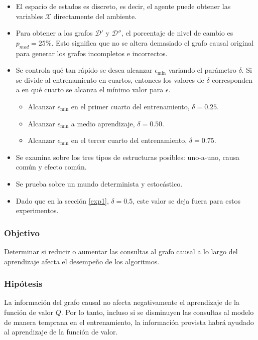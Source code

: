 \begin{itemize}
    \item El espacio de estados es discreto, es decir, el agente puede
    obtener las variables $\mathcal{X}$ directamente del ambiente.
    \item Para obtener a los
    grafos $\mathcal{D'}$ y $\mathcal{D''}$,
    el porcentaje de nivel de cambio  es $p_{mod} = 25 \%$. Esto significa que no se altera demasiado el grafo causal original para
    generar los grafos incompletos e incorrectos.
    \item Se controla qué tan rápido se desea alcanzar $\epsilon_{\min}$ variando el parámetro $\delta$. Si se divide al entrenamiento en cuartos,  entonces los valores de $\delta$ corresponden a en qué cuarto se alcanza el mínimo valor para $\epsilon$.
    \begin{itemize}
        \item Alcanzar $\epsilon_{\min}$ en el primer cuarto del entrenamiento, $\delta = 0.25$.
        \item Alcanzar $\epsilon_{\min}$ a medio aprendizaje, $\delta = 0.50$.
        \item Alcanzar $\epsilon_{\min}$ en el tercer cuarto del entrenamiento, $\delta = 0.75$.
    \end{itemize}
    \item Se examina sobre los tres tipos de estructuras posibles: uno-a-uno, 
    causa común y efecto común. 
    \item Se prueba sobre un mundo determinista y estocástico.
    \item Dado que en la sección \ref{exp1}, $\delta=0.5$, este valor se deja fuera para estos experimentos.
\end{itemize}

\subsubsection{Objetivo}

Determinar si reducir o aumentar las consultas al grafo causal a lo largo del aprendizaje afecta el desempeño
de los algoritmos.

\subsubsection{Hipótesis}

La información del grafo causal no afecta negativamente 
el aprendizaje de la función de valor $Q$. Por lo tanto, incluso si se disminuyen las consultas al modelo de manera temprana en el entrenamiento, la información provista habrá
ayudado al aprendizaje de la función de valor.

